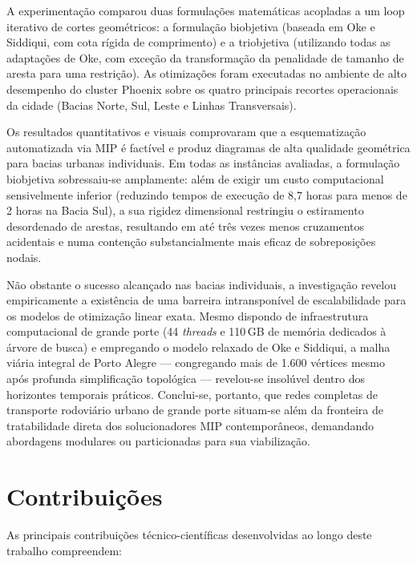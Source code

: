 \documentclass[cic,tc]{infufrgs}
\begin{document}
A experimentação comparou duas formulações matemáticas acopladas a um loop iterativo de cortes geométricos: a formulação biobjetiva (baseada em Oke e Siddiqui, com cota rígida de comprimento) e a triobjetiva (utilizando todas as adaptações de Oke, com exceção da transformação da penalidade de tamanho de aresta para uma restrição). As otimizações foram executadas no ambiente de alto desempenho do cluster Phoenix sobre os quatro principais recortes operacionais da cidade (Bacias Norte, Sul, Leste e Linhas Transversais).

Os resultados quantitativos e visuais comprovaram que a esquematização automatizada via MIP é factível e produz diagramas de alta qualidade geométrica para bacias urbanas individuais. Em todas as instâncias avaliadas, a formulação biobjetiva sobressaiu-se amplamente: além de exigir um custo computacional sensivelmente inferior (reduzindo tempos de execução de 8,7 horas para menos de 2 horas na Bacia Sul), a sua rigidez dimensional restringiu o estiramento desordenado de arestas, resultando em até três vezes menos cruzamentos acidentais e numa contenção substancialmente mais eficaz de sobreposições nodais.

Não obstante o sucesso alcançado nas bacias individuais, a investigação revelou empiricamente a existência de uma barreira intransponível de escalabilidade para os modelos de otimização linear exata. Mesmo dispondo de infraestrutura computacional de grande porte (44 \textit{threads} e 110\,GB de memória dedicados à árvore de busca) e empregando o modelo relaxado de Oke e Siddiqui, a malha viária integral de Porto Alegre — congregando mais de 1.600 vértices mesmo após profunda simplificação topológica — revelou-se insolúvel dentro dos horizontes temporais práticos. Conclui-se, portanto, que redes completas de transporte rodoviário urbano de grande porte situam-se além da fronteira de tratabilidade direta dos solucionadores MIP contemporâneos, demandando abordagens modulares ou particionadas para sua viabilização.

\section{Contribuições}
\label{sec:contribuicoes}

As principais contribuições técnico-científicas desenvolvidas ao longo deste trabalho compreendem:
\end{document}
